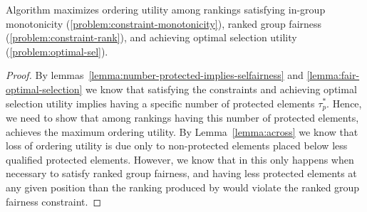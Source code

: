 \begin{lemma}
	Algorithm \algoFAIR maximizes ordering utility among rankings satisfying in-group monotonicity (\ref{problem:constraint-monotonicity}), ranked group fairness (\ref{problem:constraint-rank}), and achieving optimal selection utility (\ref{problem:optimal-sel}).
\end{lemma}

\begin{proof}
	By lemmas~\ref{lemma:number-protected-implies-selfairness} and \ref{lemma:fair-optimal-selection} we know that satisfying the constraints and achieving optimal selection utility implies having a specific number of protected elements $\tau^*_p$.
	Hence, we need to show that among rankings having this number of protected elements, \algoFAIR achieves the maximum ordering utility.
	By Lemma~\ref{lemma:across} we know that loss of ordering utility is due only to non-protected elements placed below less qualified protected elements. 
	However, we know that in \algoFAIR this only happens when necessary to satisfy ranked group fairness, and having less protected elements at any given position than the ranking produced by \algoFAIR would violate the ranked group fairness constraint.
\end{proof}



